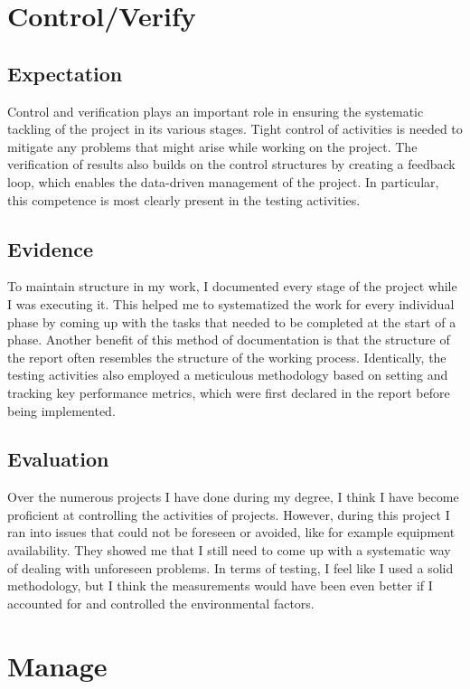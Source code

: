 \documentclass{report}
\begin{document}
\section{Control/Verify}%
\subsection{Expectation}
Control and verification plays an important role in ensuring the systematic tackling of the project in its various stages. Tight control of activities is needed to mitigate any problems that might arise while working on the project. The verification of results also builds on the control structures by creating a feedback loop, which enables the data-driven management of the project. In particular, this competence is most clearly present in the testing activities.  


\subsection{Evidence}
To maintain structure in my work, I documented every stage of the project while I was executing it. This helped me to systematized the work for every individual phase by coming up with the tasks that needed to be completed at the start of a phase. Another benefit of this method of documentation is that the structure of the report often resembles the structure of the working process. Identically, the testing activities also employed a meticulous methodology based on setting and tracking key performance metrics, which were first declared in the report before being implemented.

\subsection{Evaluation}
Over the numerous projects I have done during my degree, I think I have become proficient at controlling the activities of projects. However, during this project I ran into issues that could not be foreseen or avoided, like for example equipment availability. They showed me that I still need to come up with a systematic way of dealing with unforeseen problems. In terms of testing, I feel like I used a solid methodology, but I think the measurements would have been even better if I accounted for and controlled the environmental factors.


\section{Manage}%
\end{document}
